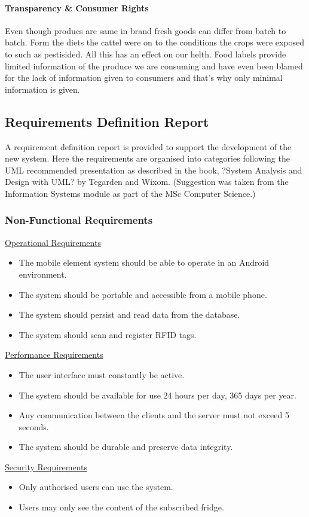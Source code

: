 \documentclass[a4paper, 11pt]{article}
\begin{document}
\paragraph{Transparency \& Consumer Rights} Even though producs are same in brand fresh goods can differ from batch to batch. Form the diets the cattel were on to the conditions the crops were exposed to such as pestisided. All this has an effect on our helth.
Food labels provide limited information of the produce we are consuming and have even been blamed for the lack of information given to consumers and that's why only minimal information is given.  

\subsection{Requirements Definition Report}
A requirement definition report is provided to support the development of the new system. Here the requirements are organised into categories following the UML recommended presentation as described in the book, ?System Analysis and Design with UML? by Tegarden and Wixom. (Suggestion was taken from the Information Systems module as part of the MSc Computer Science.)

\subsubsection{Non-Functional Requirements}
\underline{Operational Requirements}
\begin{itemize}
  \item The mobile element system should be able to operate in an Android environment. 
  \item The system should be portable and accessible from a mobile phone.
  \item The system should persist and read data from the database. 
  \item The system should scan and register RFID tags.
\end{itemize}
\underline{Performance Requirements}
\begin{itemize}
  \item The user interface must constantly be active.
  \item The system should be available for use 24 hours per day, 365 days per year.
  \item Any communication between the clients and the server must not exceed 5 seconds.
  \item The system should be durable and preserve data integrity.
\end{itemize}
\underline{Security Requirements}
\begin{itemize}
  \item Only authorised users can use the system.
  \item Users may only see the content of the subscribed fridge.
\end{itemize}
\end{document}
